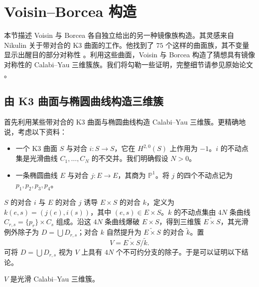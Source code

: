 \section{Voisin--Borcea 构造}\label{sec:voisin-borcea}

本节描述 Voisin 与 Borcea 各自独立给出的另一种镜像族构造。其灵感来自 Nikulin 关于带对合的 K3 曲面的工作。他找到了 $75$ 个这样的曲面族，其不变量显示出醒目的部分对称性 。利用这些曲面，Voisin 与 Borcea 构造了猜想具有镜像对称性的 Calabi--Yau 三维簇族。我们将勾勒一些证明，完整细节请参见原始论文 。

\subsection{由 K3 曲面与椭圆曲线构造三维簇}\label{subsec:voisin-threefolds}

首先利用某些带对合的 K3 曲面与椭圆曲线构造 Calabi--Yau 三维簇。更精确地说，考虑以下资料：
\begin{itemize}
\item 一个 K3 曲面 $S$ 与对合 $i:S\to S$，它在 $H^{2,0}(S)$ 上作用为 $-1$。$i$ 的不动点集是光滑曲线 $C_1,\ldots,C_N$ 的不交并。我们明确假设 $N>0$。
\item 一条椭圆曲线 $E$ 与对合 $j:E\to E$，其商为 $\mathbb P^1$。将 $j$ 的四个不动点记为 $p_1,p_2,p_3,p_4$。
\end{itemize}
$S$ 的对合 $i$ 与 $E$ 的对合 $j$ 诱导 $E\times S$ 的对合 $k$，定义为 $k(e,s)=(j(e),i(s))$，其中 $(e,s)\in E\times S$。$k$ 的不动点集由 $4N$ 条曲线 $C_{r,s}=\{p_r\}\times C_s$ 组成。沿这 $4N$ 条曲线爆破 $E\times S$，得到三维簇 $\widetilde{E\times S}$，其光滑例外除子为 $D=\bigcup D_{r,s}$；对合 $k$ 自然提升为 $\widetilde{E\times S}$ 的对合 $\widetilde k$。置
\begin{equation}\label{eq:voisin-threefold}
V=\widetilde{E\times S}/\widetilde k.
\end{equation}
可将 $D=\bigcup D_{r,s}$ 视为 $V$ 上具有 $4N$ 个不可约分支的除子。于是可以证明以下结论。
\begin{lemma}\label{lem:voisin-cy}
$V$ 是光滑 Calabi--Yau 三维簇。
\end{lemma}

